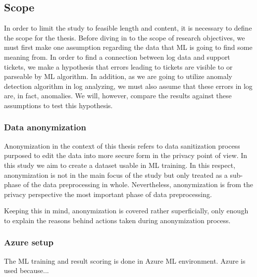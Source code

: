 
\subsection{Scope}\label{subsec:intro-scope}

In order to limit the study
to feasible length and content,
it is necessary to define the scope for the thesis.
Before diving in to the scope of research objectives,
we must first make one assumption regarding the data
that ML is going to find some meaning from.
In order to find a connection between log data and support tickets,
we make a hypothesis that errors leading to tickets
are visible to or parseable by ML algorithm.
In addition,
as we are going to utilize anomaly detection algorithm in log analyzing,
we must also assume that these errors in log
are, in fact, anomalies.
We will, however,
compare the results against these assumptions
to test this hypothesis.


\subsubsection*{Data anonymization}
Anonymization in the context of this thesis
refers to data sanitization process
purposed to edit the data into
more secure form in the privacy point of view.
In this study
we aim to create a dataset usable in ML training.
In this respect,
anonymization is not in the main focus of the study
but only treated as a sub-phase
of the data preprocessing in whole.
Nevertheless,
anonymization is from the privacy perspective
the most important phase of data preprocessing.

Keeping this in mind,
anonymization is covered rather superficially,
only enough to explain the reasons
behind actions taken during anonymization process.


\subsubsection*{Azure setup}
The ML training and result scoring
is done in Azure ML environment.
Azure is used because... %

